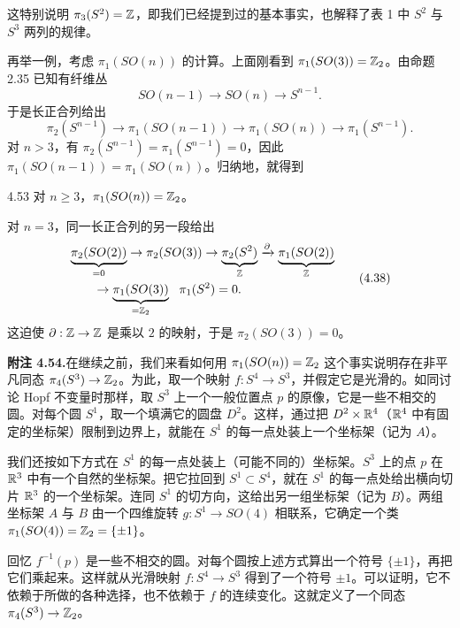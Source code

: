 这特别说明 $\pi_3(S^2)=\mathbb{Z}$，即我们已经提到过的基本事实，也解释了表 1 中 $S^2$ 与 $S^3$ 两列的规律。

再举一例，考虑 $\pi_1(SO(n))$ 的计算。上面刚看到 $\pi_1(SO(3))=\mathbb{Z}_2$。由命题 2.35 已知有纤维丛
\begin{equation}
SO(n-1)\to SO(n)\to S^{n-1}.
\tag{4.36}
\end{equation}
于是长正合列给出
\begin{equation}
\pi_2(S^{n-1})\to\pi_1(SO(n-1))\to\pi_1(SO(n))\to\pi_1(S^{n-1}).
\tag{4.37}
\end{equation}
对 $n>3$，有 $\pi_2(S^{n-1})=\pi_1(S^{n-1})=0$，因此 $\pi_1(SO(n-1))=\pi_1(SO(n))$。归纳地，就得到

\begin{example}{4.53}
对 $n\ge 3$，$\pi_1(SO(n))=\mathbb{Z}_2$。
\end{example}

对 $n=3$，同一长正合列的另一段给出
\begin{equation}
\begin{aligned}
&\underbrace{\pi_2(SO(2))}_{=0}\to\pi_2(SO(3))\to\underbrace{\pi_2(S^2)}_{\mathbb{Z}}\xrightarrow{\partial}\underbrace{\pi_1(SO(2))}_{\mathbb{Z}}\\
&\qquad\to\underbrace{\pi_1(SO(3))}_{=\mathbb{Z}_2}\ \ \pi_1(S^2)=0.
\end{aligned}
\tag{4.38}
\end{equation}
这迫使 $\partial:\mathbb{Z}\to\mathbb{Z}$ 是乘以 $2$ 的映射，于是 $\pi_2(SO(3))=0$。

\noindent\textbf{附注 4.54.}在继续之前，我们来看如何用 $\pi_1(SO(n))=\mathbb{Z}_2$ 这个事实说明存在非平凡同态 $\pi_4(S^3)\to\mathbb{Z}_2$。为此，取一个映射 $f:S^4\to S^3$，并假定它是光滑的。如同讨论 Hopf 不变量时那样，取 $S^3$ 上一个一般位置点 $p$ 的原像，它是一些不相交的圆。对每个圆 $S^1$，取一个填满它的圆盘 $D^2$。这样，通过把 $D^2\times\mathbb{R}^4$（$\mathbb{R}^4$ 中有固定的坐标架）限制到边界上，就能在 $S^1$ 的每一点处装上一个坐标架（记为 $A$）。

我们还按如下方式在 $S^1$ 的每一点处装上（可能不同的）坐标架。$S^3$ 上的点 $p$ 在 $\mathbb{R}^3$ 中有一个自然的坐标架。把它拉回到 $S^1\subset S^4$，就在 $S^1$ 的每一点处给出横向切片 $\mathbb{R}^3$ 的一个坐标架。连同 $S^1$ 的切方向，这给出另一组坐标架（记为 $B$）。两组坐标架 $A$ 与 $B$ 由一个四维旋转 $g:S^1\to SO(4)$ 相联系，它确定一个类 $\pi_1(SO(4))=\mathbb{Z}_2=\{\pm 1\}$。

回忆 $f^{-1}(p)$ 是一些不相交的圆。对每个圆按上述方式算出一个符号 $\{\pm 1\}$，再把它们乘起来。这样就从光滑映射 $f:S^4\to S^3$ 得到了一个符号 $\pm 1$。可以证明，它不依赖于所做的各种选择，也不依赖于 $f$ 的连续变化。这就定义了一个同态 $\pi_4(S^3)\to\mathbb{Z}_2$。

